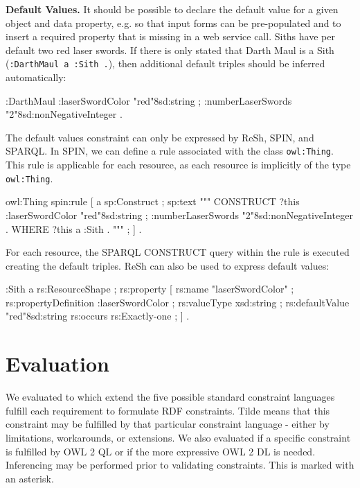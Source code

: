 \documentclass{llncs}
\newcommand{\ms}[1]{\texttt{#1}}
\begin{document}
\textbf{Default Values.}
It should be possible to declare the default value for a given object and data property, e.g. so that input forms can be pre-populated and to insert a required property that is missing in a web service call. 
Siths have per default two red laser swords.
If there is only stated that Darth Maul is a Sith (\ms{:DarthMaul a :Sith .}), then additional default triples should be inferred automatically: 

\begin{ex}
:DarthMaul 
    :laserSwordColor "red"^^xsd:string ;
    :numberLaserSwords "2"^^xsd:nonNegativeInteger .
\end{ex}

The default values constraint can only be expressed by ReSh, SPIN, and SPARQL.
In SPIN, we can define a rule associated with the class \ms{owl:Thing}.
This rule is applicable for each resource, as each resource is implicitly of the type \ms{owl:Thing}. 

\begin{ex}
owl:Thing spin:rule [ a sp:Construct ; sp:text """
    CONSTRUCT {
        ?this :laserSwordColor "red"^^xsd:string ;
              :numberLaserSwords "2"^^xsd:nonNegativeInteger . }
    WHERE {             
        ?this a :Sith . } """ ; ] .
\end{ex}

For each resource, the SPARQL CONSTRUCT query within the rule is executed creating the default triples.
ReSh can also be used to express default values:

\begin{ex}
:Sith a rs:ResourceShape ;
    rs:property [
        rs:name "laserSwordColor" ;
        rs:propertyDefinition :laserSwordColor ;
        rs:valueType xsd:string ;
        rs:defaultValue "red"^^xsd:string
        rs:occurs rs:Exactly-one ; ] .
\end{ex}

\section{Evaluation}

We evaluated to which extend the five possible standard constraint languages fulfill each requirement to formulate RDF constraints.
Tilde means that this constraint may be fulfilled by that particular constraint language - either by limitations, workarounds, or extensions.
We also evaluated if a specific constraint is fulfilled by OWL 2 QL or if the more expressive OWL 2 DL is needed. 
Inferencing may be performed prior to validating constraints. This is marked with an asterisk. 
\end{document}
